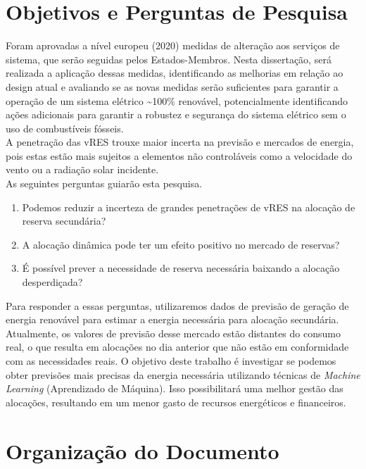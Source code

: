 \section{Objetivos e Perguntas de Pesquisa\label{se:objetivos}}

Foram aprovadas a nível europeu (2020) medidas de alteração aos serviços de sistema, que serão seguidas pelos Estados-Membros. Nesta dissertação, será realizada a aplicação dessas medidas, identificando as melhorias em relação ao design atual e avaliando se as novas medidas serão suficientes para garantir a operação de um sistema elétrico \textasciitilde100\% renovável, potencialmente identificando ações adicionais para garantir a robustez e segurança do sistema elétrico sem o uso de combustíveis fósseis. \\
A penetração das \gls{vRES} trouxe maior incerta na previsão e mercados de energia, pois estas estão mais sujeitos a elementos não controláveis como a velocidade do vento ou a radiação solar incidente.\\
As seguintes perguntas guiarão esta pesquisa.\\

\begin{enumerate}[label=\alph*)]
  \item Podemos reduzir a incerteza de grandes penetrações de \gls{vRES} na alocação de reserva secundária?
  \item A alocação dinâmica pode ter um efeito positivo no mercado de reservas?
  \item É possível prever a necessidade de reserva necessária baixando a alocação desperdiçada?
\end{enumerate}

Para responder a essas perguntas, utilizaremos dados de previsão de geração de energia renovável para estimar a energia necessária para alocação secundária. Atualmente, os valores de previsão desse mercado estão distantes do consumo real, o que resulta em alocações no dia anterior que não estão em conformidade com as necessidades reais. O objetivo deste trabalho é investigar se podemos obter previsões mais precisas da energia necessária utilizando técnicas de \textit{Machine Learning} (Aprendizado de Máquina). Isso possibilitará uma melhor gestão das alocações, resultando em um menor gasto de recursos energéticos e financeiros.

\section{Organização do Documento \label{se:organização}}


